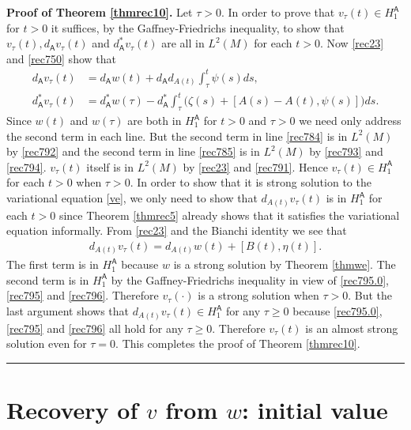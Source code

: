 \documentclass[12pt]{article}
\newenvironment{proof}[1][Proof]{\textbf{#1.} }{\ \rule{0.5em}{0.5em}}
\def \({\Big(}
\def \){\Big)}
\def \As{\mathsf{A}}
\def \eref{\eqref}
\numberwithin{equation}{section}
\begin{document}
\bigskip
\noindent
\begin{proof}[Proof of Theorem \ref{thmrec10}] Let $\tau >0$.
In order to prove that $v_\tau(t) \in H_1^\As$ for $t >0$ it suffices, by the Gaffney-Friedrichs inequality,
 to show that $v_\tau(t), d_\As v_\tau(t)$ and $d_\As^* v_\tau(t)$ are all in $L^2(M)$ for each $t >0$. Now 
 \eref{rec23} and \eref{rec750} show that  
\begin{align}
 d_\As v_\tau(t) &=  d_\As w(t) + d_\As d_{A(t)} \int_\tau^t \psi(s) ds,              \label{rec784}\\
 d_\As^* v_\tau(t) &=d_\As^* w(\tau) - d_\As^*\int_\tau^t \(\zeta(s) +[A(s)- A(t),\psi(s)] \) ds. \label{rec785}
 \end{align}
 Since   $w(t)$ and $w(\tau)$ are both in $H_1^{\As}$ for $t > 0$  and $\tau > 0$ we need only
  address the second term in each line. But 
   the second term in line \eref{rec784} is in $L^2(M)$ by \eref{rec792} and
  the second term in line \eref{rec785} is in $L^2(M)$ by \eref{rec793} and \eref{rec794}.
  $v_\tau(t)$ itself is in $L^2(M)$ by  \eref{rec23} and \eref{rec791}. Hence $v_\tau(t) \in H_1^\As$
   for each $t >0$ when  $\tau >0$. In order to show that it is  strong solution to the 
    variational    equation  \eref{ve}, we only need to show    
   that $d_{A(t)}v_\tau(t)$ is in $H_1^\As$ for each $t >0$ since Theorem \ref{thmrec5} already shows that
   it satisfies the variational equation informally. From \eref{rec23} and the Bianchi identity we see that
   \begin{align}
   d_{A(t)} v_\tau(t) = d_{A(t)} w(t) + [B(t), \eta(t)].
   \end{align}
   The first term is in $H_1^\As$  because $w$ is a strong solution by Theorem \ref{thmwe}. 
    The second term is in $H_1^\As$ by the Gaffney-Friedrichs inequality
    in view of \eref{rec795.0}, \eref{rec795} and \eref{rec796}.
          Therefore $v_\tau(\cdot)$ is a strong solution when $\tau >0$. But the last 
   argument shows that $d_{A(t)} v_\tau(t) \in H_1^{\As}$ for any $\tau \ge 0$ because 
     \eref{rec795.0},      \eref{rec795} and \eref{rec796}  all hold for  any $\tau \ge 0$. 
           Therefore $v_\tau(t)$ is an almost strong solution    even for $\tau =0$.
 This completes the proof of Theorem \ref{thmrec10}.  
\end{proof}





\section{Recovery of $v$ from $w$: initial value}  \label{secinitv}
\end{document}
